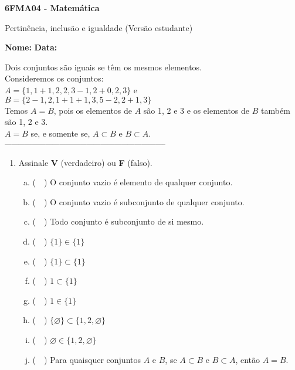 \documentclass[a4paper,14pt]{article}
\begin{document}
	
	\noindent\textbf{6FMA04 - Matemática} 
	
	\begin{center}Pertinência, inclusão e igualdade (Versão estudante)
	\end{center}
	
	\noindent\textbf{Nome:} \underline{\hspace{10cm}}
	\noindent\textbf{Data:} \underline{\hspace{4cm}}
	
	
	\begin{multicols}{2}
		\noindent Dois conjuntos são iguais se têm os mesmos elementos. \\
		Consideremos os conjuntos: \\
		$A = \{1, 1 + 1, 2, 2, 3 - 1, 2 + 0, 2, 3\}$ e \\
		$B = \{2 - 1, 2, 1 + 1 + 1, 3, 5 - 2, 2 + 1, 3\}$ \\
		Temos $A = B$, pois os elementos de $A$ são 1, 2 e 3 e os elementos de $B$ também são 1, 2 e 3. \\
		$A = B$ se, e somente se, $A \subset B$ e $B \subset A$.
		\noindent\textsubscript{-----------------------------------------------------------------------}
		\begin{enumerate}
			\item Assinale \textbf{V} (verdadeiro) ou \textbf{F} (falso).
			\begin{enumerate}[a)]
				\item (~~) O conjunto vazio é elemento de qualquer conjunto.
				\item (~~) O conjunto vazio é subconjunto de qualquer conjunto.
				\item (~~) Todo conjunto é subconjunto de si mesmo.
				\item (~~) $\{1\} \in \{1\}$
				\item (~~) $\{1\} \subset \{1\}$
				\item (~~) $1 \subset \{1\}$
				\item (~~) $1 \in \{1\}$
				\item (~~) $\{\varnothing\} \subset \{1, 2, \varnothing\}$
				\item (~~) $\varnothing \in \{1, 2, \varnothing\}$
				\item (~~) Para quaisquer conjuntos $A$ e $B$, se $A \subset B$ e $B \subset A$, então $A = B$.

\end{enumerate}
\end{enumerate}
\end{multicols}
\end{document}
